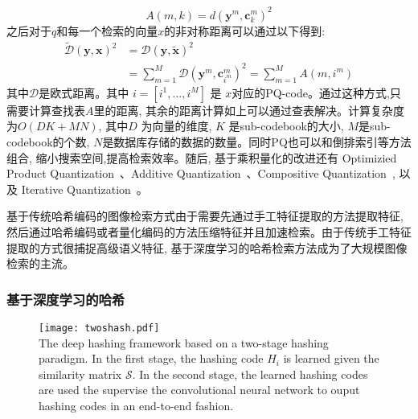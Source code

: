 \begin{equation}
    A(m, k)=d\left(\mathbf{y}^m, \mathbf{c}_k^m\right)^2
\end{equation}
之后对于$q$和每一个检索的向量$x$的非对称距离可以通过以下得到:
\begin{equation}
    \begin{aligned}
        \tilde{\mathcal{D}}(\mathbf{y}, \mathbf{x})^2 & =\mathcal{D}(\mathbf{y}, \tilde{\mathbf{x}})^2 \\
        & =\sum_{m=1}^M \mathcal{D}\left(\mathbf{y}^m, \mathbf{c}_{i^m}^m\right)^2=\sum_{m=1}^M A\left(m, i^m\right)
    \end{aligned}
\end{equation}
其中$\mathcal{D}$是欧式距离。其中 $i = \left[i^1,...,i^M \right]$ 是 $x$对应的PQ-code。通过这种方式,只需要计算查找表$A$里的距离, 其余的距离计算如上可以通过查表解决。计算复杂度为$O(DK + MN)$, 其中$D$ 为向量的维度, $K$ 是sub-codebook的大小, $M$是sub-codebook的个数, $N$是数据库存储的数据的数量。同时PQ也可以和倒排索引等方法组合, 缩小搜索空间,提高检索效率。随后, 基于乘积量化的改进还有 Optimizied Product Quantization~\cite{ge2013optimized}、Additive Quantization~\cite{martinez2016revisiting}、Compositive Quantization~\cite{zhang2014composite}, 以及 Iterative Quantization~\cite{gong2012iterative}。\par
基于传统哈希编码的图像检索方式由于需要先通过手工特征提取的方法提取特征,  然后通过哈希编码或者量化编码的方法压缩特征并且加速检索。由于传统手工特征提取的方式很捕捉高级语义特征, 基于深度学习的哈希检索方法成为了大规模图像检索的主流。

\subsubsection{基于深度学习的哈希}
\begin{figure}[!htp]
    \centering
    \texttt{[image: twoshash.pdf]} \\
      {The deep hashing framework based on a two-stage hashing paradigm. In the first stage, the hashing code $H_i$ is learned given the similarity matrix $\mathcal{S}$. In the second stage, the learned hashing codes are used the supervise the convolutional neural network to ouput hashing codes in an end-to-end fashion.  }
   \label{fig:twoshash}
\end{figure}

